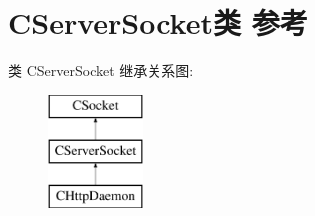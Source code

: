 \hypertarget{class_c_server_socket}{}\section{C\+Server\+Socket类 参考}
\label{class_c_server_socket}
类 C\+Server\+Socket 继承关系图\+:\begin{figure}[H]
\begin{center}
\leavevmode
\includegraphics[height=3.000000cm]{class_c_server_socket}
\end{center}
\end{figure}
